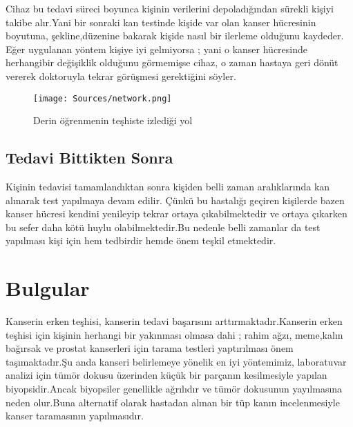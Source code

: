 \documentclass[isoft]{ssltexposter}
\begin{document}
\begin{poster}
        \hspace{2pt}Cihaz bu tedavi süreci boyunca kişinin verilerini depoladığından sürekli kişiyi takibe alır.Yani bir sonraki kan testinde kişide var olan kanser hücresinin boyutuna, şekline,düzenine bakarak kişide nasıl bir ilerleme olduğunu kaydeder. Eğer uygulanan yöntem kişiye iyi gelmiyorsa ; yani o kanser hücresinde herhangibir değişiklik olduğunu görmemişse cihaz, o zaman hastaya geri dönüt vererek doktoruyla tekrar görüşmesi gerektiğini söyler.

            \vspace{1cm}
            \begin{figure}
                \centering
                \captionsetup{type=figure}
                \texttt{[image: Sources/network.png]}
                \caption{Derin öğrenmenin teşhiste izlediği yol}
                \label{fig:ornek2}
            \end{figure}
            \vspace{1cm}
            
    \subsection{Tedavi Bittikten Sonra}
             Kişinin tedavisi tamamlandıktan sonra kişiden belli zaman aralıklarında kan alınarak test yapılmaya devam edilir. Çünkü bu hastalığı geçiren kişilerde bazen kanser hücresi kendini yenileyip tekrar ortaya çıkabilmektedir ve ortaya çıkarken bu sefer daha kötü huylu olabilmektedir.Bu nedenle belli zamanlar da test yapılması kişi için hem tedbirdir hemde önem teşkil etmektedir.
             

    \section{Bulgular}%
                
            Kanserin erken teşhisi, kanserin tedavi başarısını arttırmaktadır.Kanserin erken teşhisi için kişinin herhangi bir yakınması olmasa dahi ; rahim ağzı, meme,kalın bağırsak ve prostat kanserleri için tarama testleri yaptırılması önem taşımaktadır.Şu anda kanseri belirlemeye yönelik en iyi yöntemimiz, laboratuvar analizi için tümör dokusu üzerinden küçük bir parçanın kesilmesiyle yapılan biyopsidir.Ancak biyopsiler genellikle ağrılıdır ve tümör dokusunun yayılmasına neden olur.Buna alternatif olarak hastadan alınan bir tüp kanın incelenmesiyle kanser taramasının yapılmasıdır.



\end{poster}
\end{document}
